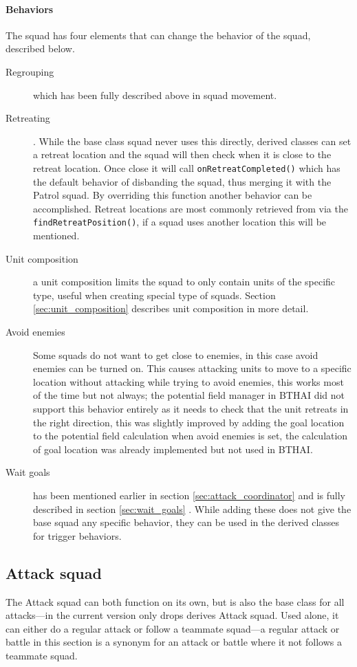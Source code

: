 \paragraph{Behaviors}
The squad has four elements that can change the behavior of the squad, described below.
\begin{description}
	\item[Regrouping] which has been fully described above in squad movement.
	\item[Retreating]. While the base class squad never uses this directly, derived classes can set a
		retreat location and the squad will then check when it is close to the retreat location. Once
		close it will call \texttt{onRetreatCompleted()} which has the default behavior of disbanding
		the squad, thus merging it with the Patrol squad. By overriding this function another behavior
		can be accomplished. Retreat locations are most commonly retrieved from
		 via the \texttt{findRetreatPosition()}, if a squad uses another
		location this will be mentioned.
	\item[Unit composition] a unit composition limits the squad to only contain units of the specific
		type, useful when creating special type of squads. Section \ref{sec:unit_composition} describes
		unit composition in more detail.
	\item[Avoid enemies] Some squads do not want to get close to enemies, in this case avoid enemies
		can be turned on. This causes attacking units to move to a specific location without attacking
		while trying to avoid enemies, this works most of the time but not always; the potential field
		manager in BTHAI did not support this behavior entirely as it needs to check that the unit
		retreats in the right direction, this was slightly improved by adding the goal location to the
		potential field calculation when avoid enemies is set, the calculation of goal location was
		already implemented but not used in BTHAI.
	\item[Wait goals] has been mentioned earlier in section \ref{sec:attack_coordinator}
		 and is fully described in section \ref{sec:wait_goals}
		. While adding these does not give the base squad any specific behavior,
		they can be used in the derived classes for trigger behaviors.
\end{description}

\subsection{Attack squad}
\label{sec:attack_squad} The Attack squad can both function on its own, but is also the base class
for all attacks—in the current version only drops derives Attack squad. Used alone, it can either do
a regular attack or follow a teammate squad—a regular attack or battle in this section is a synonym
for an attack or battle where it not follows a teammate squad.

